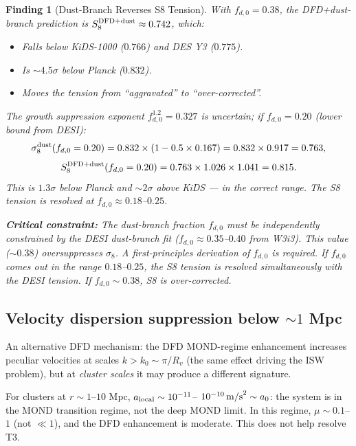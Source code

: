 \documentclass[11pt]{article}
\newtheorem{finding}{Finding}
\newcommand{\mufd}{\mu}
\newcommand{\DFD}{{\rm DFD}}
\begin{document}
\begin{finding}[Dust-Branch Reverses S8 Tension]\label{find:s8-dust}
With $f_{d,0} = 0.38$, the DFD+dust-branch prediction is
$S_8^{\DFD+\rm dust} \approx 0.742$, which:
\begin{itemize}[nosep]
  \item Falls \emph{below} KiDS-1000 ($0.766$) and DES Y3 ($0.775$).
  \item Is $\sim 4.5\sigma$ below Planck ($0.832$).
  \item Moves the tension from ``aggravated'' to ``over-corrected''.
\end{itemize}
The growth suppression exponent $f_{d,0}^{1.2} = 0.327$ is uncertain; if
$f_{d,0} = 0.20$ (lower bound from DESI):
\begin{equation}
  \sigma_8^{\rm dust}(f_{d,0}=0.20) = 0.832\times(1 - 0.5\times 0.167) = 0.832\times 0.917 = 0.763,
\end{equation}
\begin{equation}
  S_8^{\DFD+\rm dust}(f_{d,0}=0.20) = 0.763\times 1.026\times 1.041 = 0.815.
\end{equation}
This is $1.3\sigma$ below Planck and $\sim 2\sigma$ above KiDS --- in the
correct range.  The S8 tension is resolved at $f_{d,0} \approx 0.18$--$0.25$.

\textbf{Critical constraint:} The dust-branch fraction $f_{d,0}$ must be
independently constrained by the DESI dust-branch fit ($f_{d,0} \approx
0.35$--$0.40$ from W3i3). This value ($\sim 0.38$) oversuppresses $\sigma_8$.
A first-principles derivation of $f_{d,0}$ is required.  If $f_{d,0}$ comes
out in the range $0.18$--$0.25$, the S8 tension is resolved simultaneously
with the DESI tension.  If $f_{d,0} \sim 0.38$, S8 is over-corrected.
\end{finding}

\subsection{Velocity dispersion suppression below $\sim 1$ Mpc}

An alternative DFD mechanism: the DFD MOND-regime enhancement increases
peculiar velocities at scales $k > k_0 \sim \pi/R_v$ (the same effect
driving the ISW problem), but at \emph{cluster scales} it may produce
a different signature.

For clusters at $r \sim 1$--$10$ Mpc, $a_{\rm local} \sim 10^{-11}$--
$10^{-10}\,{\rm m/s}^2 \sim a_0$: the system is in the MOND transition
regime, not the deep MOND limit.  In this regime, $\mufd \sim 0.1$--$1$
(not $\ll 1$), and the DFD enhancement is moderate.  This does not
help resolve T3.
\end{document}
